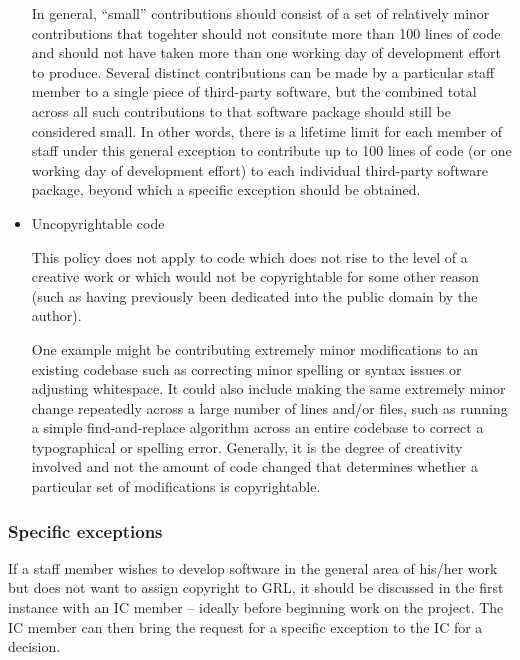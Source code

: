 \documentclass[10pt,a4paper]{article}
\begin{document}
\begin{itemize}
\par In general, ``small'' contributions should consist of a set of relatively minor 
contributions that togehter should not consitute more than 100 lines of code 
and should not have taken more than one working day of development effort 
to produce. Several distinct contributions can be made by a particular staff 
member to a single piece of third-party software, but the combined total across 
all such contributions to that software package should still be considered small. 
In other words, there is a lifetime limit for each member of staff under this general 
exception to contribute up to 100 lines of code (or one working day of 
development effort) to each individual third-party software package, beyond 
which a specific exception should be obtained. 

\item Uncopyrightable code

\par This policy does not apply to code which does not rise to the level of a 
creative work or which would not be copyrightable for some other reason 
(such as having previously been dedicated into the public domain by the author). 

\par One example might be contributing extremely minor modifications to an existing 
codebase such as correcting minor spelling or syntax issues or adjusting whitespace. 
It could also include making the same extremely minor change repeatedly across a 
large number of lines and/or files, such as running a simple find-and-replace 
algorithm across an entire codebase to correct a typographical or spelling error. 
Generally, it is the degree of creativity involved and not the amount of code changed 
that determines whether a particular set of modifications is copyrightable. 

\end{itemize}


\subsubsection{Specific exceptions}
\label{policy.copyright.specexcept}

\par If a staff member wishes to develop software in the general area of his/her work 
but does not want to assign copyright to GRL, it should be discussed in the first 
instance with an IC member -- ideally before beginning work on the project. The IC 
member can then bring the request for a specific exception to the IC for a decision. 
\end{document}
